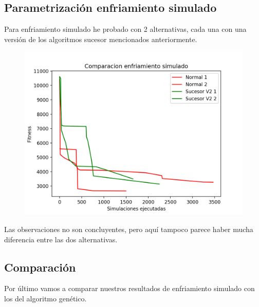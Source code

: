 \documentclass[a4paper, 11pt]{article}
\begin{document}
	\subsection{Parametrización enfriamiento simulado}
		Para enfriamiento simulado he probado con 2 alternativas, cada una con una versión de los algoritmos sucesor mencionados anteriormente. \\
		\begin{figure}[htb!]
			\begin{minipage}{0.8\textwidth}
				\centering
				\includegraphics[scale=1]{images/comparacion_sim}
				\label{fig:comparacion_sim}
			\end{minipage}\hfill
		\end{figure}
		Las observaciones no son concluyentes, pero aquí tampoco parece haber mucha diferencia entre las dos alternativas. 
		
		\clearpage
	 \subsection{Comparación}
	 	Por último vamos a comparar nuestros resultados de enfriamiento simulado con los del algoritmo genético. \\ 
	 	
\end{document}
